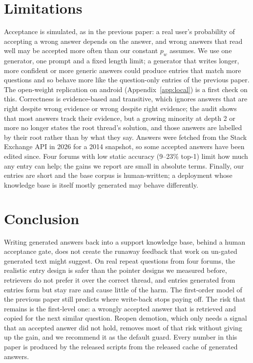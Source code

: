\documentclass[11pt]{article}
\begin{document}
\section{Limitations}
Acceptance is simulated, as in the previous paper: a real user's probability of accepting a wrong answer depends on the answer, and wrong answers that read well may be accepted more often than our constant $p_w$ assumes. We use one generator, one prompt and a fixed length limit; a generator that writes longer, more confident or more generic answers could produce entries that match more questions and so behave more like the question-only entries of the previous paper. The open-weight replication on android (Appendix~\ref{app:local}) is a first check on this. Correctness is evidence-based and transitive, which ignores answers that are right despite wrong evidence or wrong despite right evidence; the audit shows that most answers track their evidence, but a growing minority at depth 2 or more no longer states the root thread's solution, and those answers are labelled by their root rather than by what they say. Answers were fetched from the Stack Exchange API in 2026 for a 2014 snapshot, so some accepted answers have been edited since. Four forums with low static accuracy (9--23\% top-1) limit how much any entry can help; the gains we report are small in absolute terms. Finally, our entries are short and the base corpus is human-written; a deployment whose knowledge base is itself mostly generated may behave differently.

\section{Conclusion}
Writing generated answers back into a support knowledge base, behind a human acceptance gate, does not create the runaway feedback that work on un-gated generated text might suggest. On real repeat questions from four forums, the realistic entry design is safer than the pointer designs we measured before, retrievers do not prefer it over the correct thread, and entries generated from entries form but stay rare and cause little of the harm. The first-order model of the previous paper still predicts where write-back stops paying off. The risk that remains is the first-level one: a wrongly accepted answer that is retrieved and copied for the next similar question. Reopen demotion, which only needs a signal that an accepted answer did not hold, removes most of that risk without giving up the gain, and we recommend it as the default guard. Every number in this paper is produced by the released scripts from the released cache of \nGenTotal{} generated answers.
\end{document}
